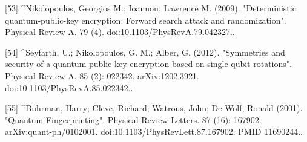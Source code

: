 [53]
^Nikolopoulos, Georgios M.; Ioannou, Lawrence M. (2009). "Deterministic quantum-public-key encryption: Forward search attack and randomization". Physical Review A. 79 (4). doi:10.1103/PhysRevA.79.042327..

[54]
^Seyfarth, U.; Nikolopoulos, G. M.; Alber, G. (2012). "Symmetries and security of a quantum-public-key encryption based on single-qubit rotations". Physical Review A. 85 (2): 022342. arXiv:1202.3921. doi:10.1103/PhysRevA.85.022342..

[55]
^Buhrman, Harry; Cleve, Richard; Watrous, John; De Wolf, Ronald (2001). "Quantum Fingerprinting". Physical Review Letters. 87 (16): 167902. arXiv:quant-ph/0102001. doi:10.1103/PhysRevLett.87.167902. PMID 11690244..